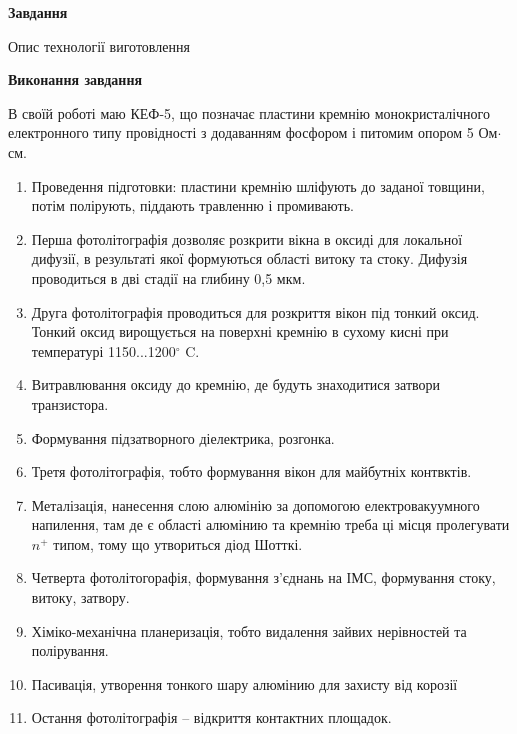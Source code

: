 \documentclass[a4paper,14pt]{extreport}
\begin{document}
\begin{center}
    \textbf{Завдання}
\end{center}
Опис технології виготовлення


\begin{center}
  \textbf{Виконання завдання}
\end{center}

В своїй роботі маю КЕФ-5, що позначає пластини кремнію монокристалічного електронного типу провідності з додаванням фосфором і питомим опором 5 Ом$\cdot$см.\\

\begin{enumerate}
 \item Проведення підготовки: пластини кремнію шліфують до заданої товщини, потім полірують, піддають травленню і промивають. 



\item Перша фотолітографія дозволяє розкрити вікна в оксиді для локальної дифузії, в результаті якої формуються області витоку та стоку. Дифузія проводиться в дві
стадії на глибину 0,5 мкм.\\

\item Друга фотолітографія проводиться для розкриття вікон під тонкий оксид. Тонкий оксид вирощується на поверхні кремнію в сухому кисні при температурі 1150...1200$^{\circ}$ C.\\

\item Витравлювання оксиду до кремнію, де будуть знаходитися затвори транзистора.\\

\item Формування підзатворного діелектрика, розгонка.\\

\item Третя фотолітографія, тобто формування вікон для майбутніх контвктів.\\

\item Металізація, нанесення слою алюмінію за допомогою електровакуумного напилення, там де є області алюмінию та кремнію треба ці місця пролегувати $n^+ $ типом, тому що утвориться діод Шотткі.\\

\item Четверта фотолітогорафія, формування з'єднань на ІМС, формування стоку, витоку, затвору.\\

\item Хіміко-механічна планеризація, тобто видалення зайвих нерівностей та полірування.\\

\item Пасивація, утворення тонкого шару алюмінию для захисту від корозії\\

\item Остання фотолітографія -- відкриття контактних площадок.


\end{enumerate}
\end{document}
